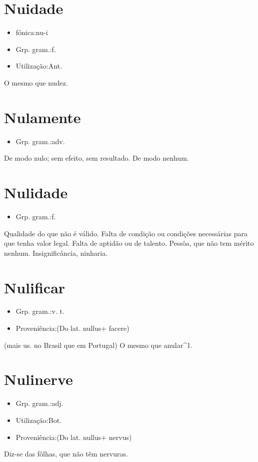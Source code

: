 \section{Nuidade}
\begin{itemize}
\item {fónica:nu-i}
\end{itemize}
\begin{itemize}
\item {Grp. gram.:f.}
\end{itemize}
\begin{itemize}
\item {Utilização:Ant.}
\end{itemize}
O mesmo que \textunderscore nudez\textunderscore .
\section{Nulamente}
\begin{itemize}
\item {Grp. gram.:adv.}
\end{itemize}
De modo nulo; sem efeito, sem resultado.
De modo nenhum.
\section{Nulidade}
\begin{itemize}
\item {Grp. gram.:f.}
\end{itemize}
Qualidade do que não é válido.
Falta de condição ou condições necessárias para que tenha valor legal.
Falta de aptidão ou de talento.
Pessôa, que não tem mérito nenhum.
Insignificância, ninharia.
\section{Nulificar}
\begin{itemize}
\item {Grp. gram.:v. t.}
\end{itemize}
\begin{itemize}
\item {Proveniência:(Do lat. \textunderscore nullus\textunderscore  + \textunderscore facere\textunderscore )}
\end{itemize}
(mais us. no Brasil que em Portugal)
O mesmo que \textunderscore anular\textunderscore ^1.
\section{Nulinerve}
\begin{itemize}
\item {Grp. gram.:adj.}
\end{itemize}
\begin{itemize}
\item {Utilização:Bot.}
\end{itemize}
\begin{itemize}
\item {Proveniência:(Do lat. \textunderscore nullus\textunderscore  + \textunderscore nervus\textunderscore )}
\end{itemize}
Diz-se das fôlhas, que não têm nervuras.
